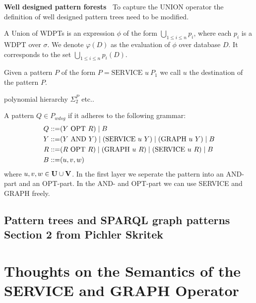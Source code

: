 			\bigskip \noindent
			\textbf{Well designed pattern forests~\cite{barcelo2015efficient}}
			To capture the UNION operator the definition of well designed pattern trees
			need to be modified.  
			\begin{definition}
				A Union of WDPTs is an expression $\phi$ of the form $\bigcup_{1\leq i \leq n} p_i$, 
				where each $p_i$ is a WDPT over $\sigma$.
				We denote $\varphi(D)$ as the evaluation of $\phi$ over database $D$.
				It corresponds to the set $\bigcup_{1\leq i \leq n}p_i(D)$.

			\end{definition}
			\begin{definition}
				Given a pattern $P$ of the form $P = \mbox{SERVICE } u \ P_1$ we call $u$ the
				destination of the pattern $P$.

			\end{definition}

			\begin{definition}
				polynomial hierarchy $\Sigma^P_2$ etc..
			\end{definition}

			\begin{definition}[$P_{wdsg}$]
				A pattern $Q \in P_{wdsg}$ if it adheres to the following grammar:
				\begin{align*}
					Q::= &  (Y \mbox{ OPT } R)  \mid B \\
					Y::= & (Y \mbox{ AND } Y) \mid (\mbox{SERVICE } u \ Y) \mid (\mbox{GRAPH } u \
					Y) \mid  B\\
					R::= &(R \mbox{ OPT } R) \mid (\mbox{GRAPH } u \ R) \mid (\mbox{SERVICE } u \ R) \mid B  \\
					B::= &(u,v,w)
				\end{align*}
				where	$u,v,w \in \mathbf{U} \cup \mathbf{V}$. In the first layer we seperate the pattern
				into an AND-part and an OPT-part. In the AND- and OPT-part we can use
				SERVICE and GRAPH freely.

			\end{definition}

			\subsection*{Pattern trees and SPARQL graph patterns
			Section 2 from Pichler Skritek}

			\section{Thoughts on the Semantics of the SERVICE and GRAPH Operator}

